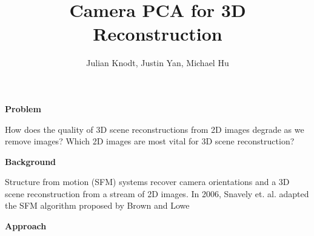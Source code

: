\documentclass[11pt]{extarticle}
\title{Camera PCA for 3D Reconstruction \vspace{-1ex}}
\author{Julian Knodt, Justin Yan, Michael Hu}
\date{}
\begin{document}
\maketitle


{\large \textbf{Problem}}

How does the quality of 3D scene reconstructions from 2D images degrade as we remove images? Which 2D images are most vital for 3D scene reconstruction?

{\large \textbf{Background}}

Structure from motion (SFM) systems recover camera orientations and a 3D scene reconstruction from a stream of 2D images. In 2006, Snavely et. al. adapted the SFM algorithm proposed by Brown and Lowe \cite{2006}

{\large \textbf{Approach}}


% 

\end{document}
